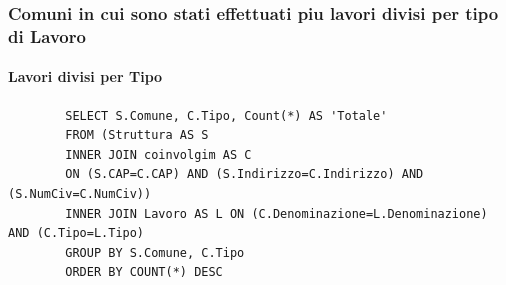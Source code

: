 \documentclass{elegantbook}
\begin{document}
\subsubsection{Comuni in cui sono stati effettuati piu lavori divisi per tipo di Lavoro}
\paragraph{Lavori divisi per Tipo}
	\begin{verbatim}
		SELECT S.Comune, C.Tipo, Count(*) AS 'Totale'
		FROM (Struttura AS S 
		INNER JOIN coinvolgim AS C 
		ON (S.CAP=C.CAP) AND (S.Indirizzo=C.Indirizzo) AND (S.NumCiv=C.NumCiv))
		INNER JOIN Lavoro AS L ON (C.Denominazione=L.Denominazione) AND (C.Tipo=L.Tipo)
		GROUP BY S.Comune, C.Tipo
		ORDER BY COUNT(*) DESC
	\end{verbatim}
\begin{figure}[H]
	\centering
\end{figure}
\end{document}
